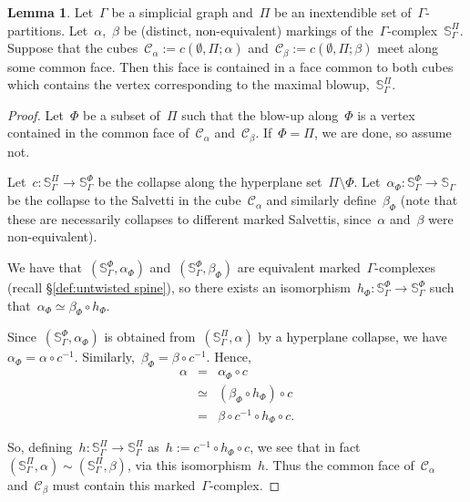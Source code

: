\documentclass[11pt]{amsart}
\theoremstyle{definition}
\theoremstyle{definition}
\theoremstyle{definition}
\theoremstyle{definition}
\newtheorem{lemma}[theorem]{Lemma}
\newcommand{\sal}{\mathbb{S}_{\Gamma}} %
\newcommand{\salb}[1]{\mathbb{S}_\Gamma^{#1}} %
\begin{document}
\begin{lemma}\label{lem:meet on (n-1)-face}
    Let~$\Gamma$ be a simplicial graph and~$\Pi$ be an inextendible set of~$\Gamma$-partitions. Let~$\alpha$,~$\beta$ be (distinct, non-equivalent) markings of the~$\Gamma$-complex~$\salb{\Pi}$. Suppose that the cubes~$\mathcal{C}_{\alpha} := c(\emptyset, \Pi; \alpha)$ and~$\mathcal{C}_{\beta} := c(\emptyset, \Pi; \beta)$ meet along some common face. Then this face is contained in a face common to both cubes which contains the vertex corresponding to the maximal blowup,~$\salb{\Pi}$.
\end{lemma}

\begin{proof}
Let~$\Phi$ be a subset of~$\Pi$ such that the blow-up along~$\Phi$ is a vertex contained in the common face of~$\mathcal{C}_{\alpha}$ and~$\mathcal{C}_{\beta}$. If~$\Phi = \Pi$, we are done, so assume not.

Let~$c : \salb{\Pi} \to \salb{\Phi}$ be the collapse along the hyperplane set~$\Pi \setminus \Phi$. Let~$\alpha_{\Phi} : \salb{\Phi} \to \sal$ be the collapse to the Salvetti in the cube~$\mathcal{C}_{\alpha}$ and similarly define~$\beta_{\Phi}$ (note that these are necessarily collapses to different marked Salvettis, since~$\alpha$ and~$\beta$ were non-equivalent). 

We have that~$(\salb{\Phi}, \alpha_{\Phi})$ and~$(\salb{\Phi}, \beta_{\Phi})$ are equivalent marked~$\Gamma$-complexes (recall \S\ref{def:untwisted spine}), so there exists an isomorphism~$h_{\Phi} : \salb{\Phi} \to \salb{\Phi}$ such that~$\alpha_{\Phi} \simeq \beta_{\Phi} \circ h_{\Phi}$.

Since~$(\salb{\Phi}, \alpha_{\Phi})$ is obtained from~$(\salb{\Pi}, \alpha)$ by a hyperplane collapse, we have~$\alpha_{\Phi} = \alpha \circ c^{-1}$. Similarly,~$\beta_{\Phi} = \beta \circ c^{-1}$. Hence,
\begin{eqnarray*}
    \alpha & = & \alpha_{\Phi} \circ c \\
    & \simeq & (\beta_{\Phi} \circ h_{\Phi}) \circ c \\
    & = & \beta \circ c^{-1} \circ h_{\Phi} \circ c.
\end{eqnarray*}

So, defining~$h:\salb{\Pi} \to \salb{\Pi}$ as~$h := c^{-1} \circ h_{\Phi} \circ c$, we see that in fact~$(\salb{\Pi}, \alpha) \sim (\salb{\Pi}, \beta)$, via this isomorphism~$h$. Thus the common face of~$\mathcal{C}_{\alpha}$ and~$\mathcal{C}_{\beta}$ must contain this marked~$\Gamma$-complex.
\end{proof}
\end{document}
